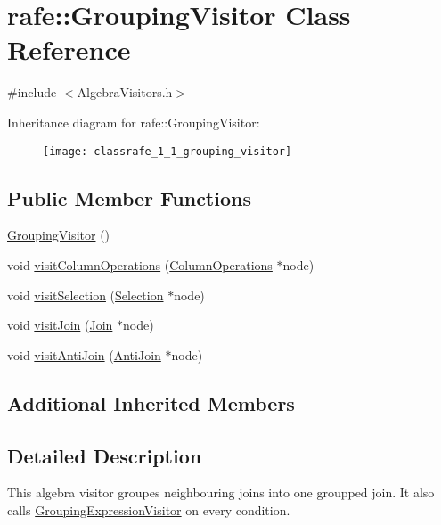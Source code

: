 \hypertarget{classrafe_1_1_grouping_visitor}{\section{rafe\+:\+:Grouping\+Visitor Class Reference}
\label{classrafe_1_1_grouping_visitor}
}


{\ttfamily \#include $<$Algebra\+Visitors.\+h$>$}

Inheritance diagram for rafe\+:\+:Grouping\+Visitor\+:\begin{figure}[H]
\begin{center}
\leavevmode
\texttt{[image: classrafe\_1\_1\_grouping\_visitor]}
\end{center}
\end{figure}
\subsection*{Public Member Functions}
\begin{DoxyCompactItemize}
\item 
\hyperlink{classrafe_1_1_grouping_visitor_a33accac3eae9e1ecb557acf7c7867d45}{Grouping\+Visitor} ()
\item 
void \hyperlink{classrafe_1_1_grouping_visitor_acb0f1d2cd1d7432d812191841efc6f60}{visit\+Column\+Operations} (\hyperlink{classrafe_1_1_column_operations}{Column\+Operations} $\ast$node)
\item 
void \hyperlink{classrafe_1_1_grouping_visitor_a7287bb0601e55028ef362604144eae23}{visit\+Selection} (\hyperlink{classrafe_1_1_selection}{Selection} $\ast$node)
\item 
void \hyperlink{classrafe_1_1_grouping_visitor_a519732d6b549b84cd543ab61aa7630f1}{visit\+Join} (\hyperlink{classrafe_1_1_join}{Join} $\ast$node)
\item 
void \hyperlink{classrafe_1_1_grouping_visitor_aa5f7889f7fc5ec289d7ee1107b441c0c}{visit\+Anti\+Join} (\hyperlink{classrafe_1_1_anti_join}{Anti\+Join} $\ast$node)
\end{DoxyCompactItemize}
\subsection*{Additional Inherited Members}


\subsection{Detailed Description}
This algebra visitor groupes neighbouring joins into one groupped join. It also calls \hyperlink{classrafe_1_1_grouping_expression_visitor}{Grouping\+Expression\+Visitor} on every condition. 

